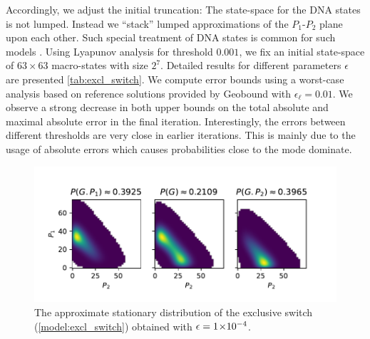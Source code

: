 Accordingly, we adjust
the initial truncation:
The state-space for the DNA states is not lumped. Instead we ``stack''
lumped approximations of the $P_1$-$P_2$ plane upon each other.
Such special treatment of DNA states is common for such models \parencite{lapin2011shave}.
Using Lyapunov analysis for threshold $0.001$, we fix an initial state-space of $63\times 63$ macro-states with size $2^7$. Detailed results for different parameters $\epsilon$ are presented \autoref{tab:excl_switch}.
We compute error bounds using a worst-case analysis based on reference solutions provided by Geobound with $\epsilon_{\ell}=0.01$.
We observe a strong decrease in both upper bounds on the total absolute and maximal absolute error in the final iteration.
Interestingly, the errors between different thresholds are very close in earlier iterations.
This is mainly due to the usage of absolute errors which causes probabilities close to the mode dominate.
\begin{figure}[htb]
    \centering
    \includegraphics[scale=.7]{gfx/excl_switch_dist.pdf}
	\caption[Approximate stationary distribution of the exclusive switch]{The approximate stationary distribution of the exclusive switch (\autoref{model:excl_switch}) obtained with $\epsilon= 1\!\times\hspace{-.5ex} 10^{-4} $.}
    \label{fig:excl_switch:excl_switch_dist}
\end{figure}



